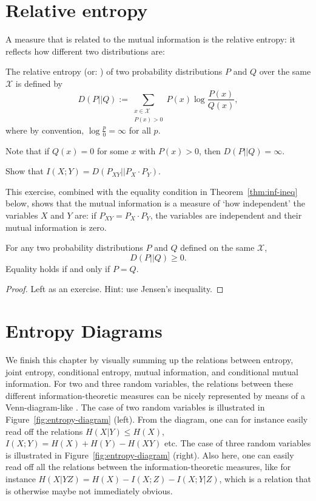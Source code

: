 \section{Relative entropy}
A measure that is related to the mutual information is the relative entropy: it reflects how different two distributions are:
\begin{definition}
The relative entropy (or: ) of two probability distributions $P$ and $Q$ over the same $\mathcal{X}$ is defined by
\[
D(P||Q) := \sum_{\substack{x \in \mathcal{X} \\ P(x) > 0}} P(x) \log \frac{P(x)}{Q(x)},
\]
where by convention, $\log\frac{p}{0} = \infty$ for all $p$.
\end{definition}
Note that if $Q(x) = 0$ for some $x$ with $P(x) > 0$, then $D(P||Q) = \infty$.

\begin{exercise}
Show that $I(X;Y) = D(P_{XY} || P_X \cdot P_Y)$. 
\end{exercise}
This exercise, combined with the equality condition in Theorem~\ref{thm:inf-ineq} below, shows that the mutual information is a measure of `how independent' the variables $X$ and $Y$ are: if $P_{XY} = P_X \cdot P_Y$, the variables are independent and their mutual information is zero.

\begin{theorem}\label{thm:inf-ineq}
For any two probability distributions $P$ and $Q$ defined on the same $\mathcal{X}$,
\[
D(P||Q) \geq 0.
\]
Equality holds if and only if $P = Q$.
\end{theorem}
\begin{proof}
Left as an exercise. Hint: use Jensen's inequality.
\end{proof}



\section{Entropy Diagrams}\label{sec:Venn}
We finish this chapter by visually summing up the relations between entropy, joint entropy, conditional entropy, mutual information, and conditional mutual information. For two and three random variables, the relations between these different information-theoretic measures can be nicely represented by means of a Venn-diagram-like . The case of two random variables is illustrated in Figure~\ref{fig:entropy-diagram} (left). From the diagram, one can for instance easily read off the relations $H(X|Y) \leq H(X)$, $I(X;Y) = H(X) + H(Y) - H(XY)$ etc. The case of three random variables is illustrated in Figure~\ref{fig:entropy-diagram} (right). Also here, one can easily read off all the relations between the information-theoretic measures, like for instance $H(X|YZ) = H(X) -I(X;Z) - I(X;Y|Z)$, which is a relation that is otherwise maybe not immediately obvious.

